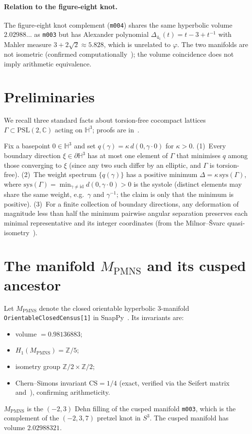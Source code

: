 \documentclass[12pt]{article}
\theoremstyle{definition}
\theoremstyle{remark}
\newcommand{\Hthree}{\mathbb{H}^3}
\newcommand{\Z}{\mathbb{Z}}
\newcommand{\C}{\mathbb{C}}
\newcommand{\vp}{\varphi}
\begin{document}
\paragraph{Relation to the figure-eight knot.}
The figure-eight knot complement (\texttt{m004}) shares the same
hyperbolic volume $2.02988\ldots$ as \texttt{m003} but has Alexander
polynomial $\Delta_{4_1}(t)=t-3+t^{-1}$ with Mahler measure
$3+2\sqrt2\approx5.828$, which is unrelated to $\vp$.  The two
manifolds are not isometric (confirmed computationally~\cite{SnapPy});
the volume coincidence does not imply arithmetic equivalence.

\section{Preliminaries}
\label{sec:prelim}

We recall three standard facts about torsion-free cocompact lattices
$\Gamma\subset\mathrm{PSL}(2,\C)$ acting on $\Hthree$; proofs are
in~\cite{ratcliffe,bridsonhaefliger}.

Fix a basepoint $0\in\Hthree$ and set $q(\gamma)=\kappa\,d(0,\gamma\cdot0)$
for $\kappa>0$.  (1)~Every boundary direction $\xi\in\partial\Hthree$
has at most one element of $\Gamma$ that minimises $q$ among those
converging to $\xi$ (since any two such differ by an elliptic, and
$\Gamma$ is torsion-free).  (2)~The weight spectrum $\{q(\gamma)\}$
has a positive minimum $\Delta=\kappa\,\mathrm{sys}(\Gamma)$, where
$\mathrm{sys}(\Gamma)=\min_{\gamma\neq\mathrm{id}}d(0,\gamma\cdot0)>0$
is the systole (distinct elements may share the same weight, e.g.\
$\gamma$ and $\gamma^{-1}$; the claim is only that the minimum is
positive).  (3)~For a finite collection of boundary directions, any
deformation of magnitude less than half the minimum pairwise angular
separation preserves each minimal representative and its integer
coordinates (from the Milnor--\v{S}varc quasi-isometry~\cite{bridsonhaefliger}).

\section{The manifold $M_{\mathrm{PMNS}}$ and its cusped ancestor}
\label{sec:manifold}

Let $M_{\mathrm{PMNS}}$ denote the closed orientable hyperbolic
3-manifold \texttt{OrientableClosedCensus[1]} in SnapPy~\cite{SnapPy}.
Its invariants are:
\begin{itemize}
\item volume $= 0.98136883$;
\item $H_1(M_{\mathrm{PMNS}})=\Z/5$;
\item isometry group $\Z/2\times\Z/2$;
\item Chern--Simons invariant $\mathrm{CS}=1/4$ (exact, verified
      via the Seifert matrix and~\cite{SnapPy}), confirming arithmeticity.
\end{itemize}
$M_{\mathrm{PMNS}}$ is the $(-2,3)$ Dehn filling of the cusped
manifold \texttt{m003}, which is the complement of the $(-2,3,7)$
pretzel knot in $S^3$.  The cusped manifold has volume $2.02988321$.
\end{document}

